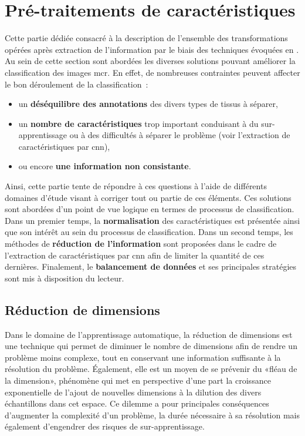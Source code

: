 \clearpage


\section{Pré-traitements de caractéristiques}
Cette partie dédiée consacré à la description de l'ensemble des transformations opérées après extraction de l'information par le biais des techniques évoquées en . Au sein de cette section sont abordées les diverses solutions pouvant améliorer la classification des images \gls{mcr}. En effet, de nombreuses contraintes peuvent affecter le bon déroulement de la classification~:
\begin{itemize}
    \item un \textbf{déséquilibre des annotations} des divers types de tissus à séparer,
    \item un \textbf{nombre de caractéristiques} trop important conduisant à du sur-apprentissage ou à des difficultés à séparer le problème (voir l'extraction de caractéristiques par \gls{cnn}),
    \item ou encore \textbf{une information non consistante}.
\end{itemize}\par

Ainsi, cette partie tente de répondre à ces questions à l'aide de différents domaines d'étude visant à corriger tout ou partie de ces éléments. Ces solutions sont abordées d'un point de vue logique en termes de processus de classification. Dans un premier temps, la \textbf{normalisation} des caractéristiques est présentée ainsi que son intérêt au sein du processus de classification. Dans un second temps, les méthodes de \textbf{réduction de l'information} sont proposées dans le cadre de l'extraction de caractéristiques par \gls{cnn} afin de limiter la quantité de ces dernières. Finalement, le \textbf{balancement de données} et ses principales stratégies sont mis à disposition du lecteur.

\subsection{Réduction de dimensions}
Dans le domaine de l'apprentissage automatique, la réduction de dimensions est une technique qui permet de diminuer le nombre de dimensions afin de rendre un problème moins complexe, tout en conservant une information suffisante à la résolution du problème. Également, elle est un moyen de se prévenir du «fléau de la dimension», phénomène qui met en perspective d'une part la croissance exponentielle de l'ajout de nouvelles dimensions à la dilution des divers échantillons dans cet espace. Ce dilemme a pour principales conséquences d'augmenter la complexité d'un problème, la durée nécessaire à sa résolution mais également d'engendrer des risques de sur-apprentissage.\par

